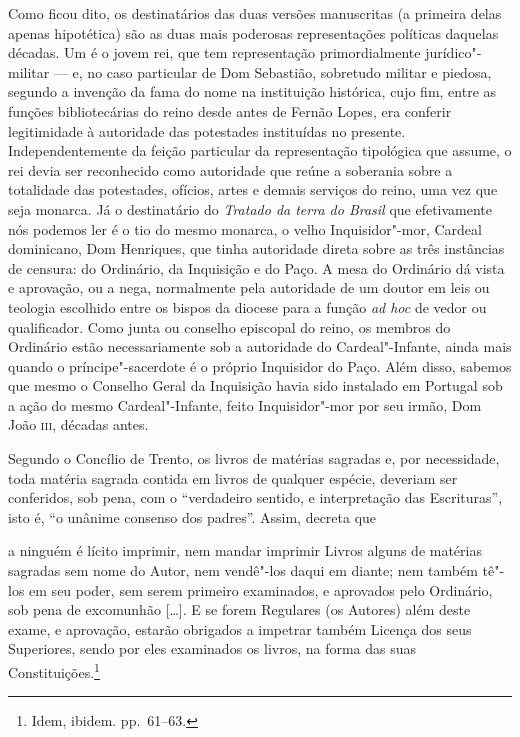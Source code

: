 Como ficou dito, os destinatários das duas versões manuscritas (a
primeira delas apenas hipotética) são as duas mais poderosas
representações políticas daquelas décadas. Um é o jovem rei, que tem
representação primordialmente jurídico"-militar --- e, no caso particular
de Dom Sebastião, sobretudo militar e piedosa, segundo a invenção da
fama do nome na instituição histórica, cujo fim, entre as funções
bibliotecárias do reino desde antes de Fernão Lopes, era conferir
legitimidade à autoridade das potestades instituídas no presente.
Independentemente da feição particular da representação tipológica que
assume, o rei devia ser reconhecido como autoridade que reúne a
soberania sobre a totalidade das potestades, ofícios, artes e demais
serviços do reino, uma vez que seja monarca. Já o destinatário do
\textit{Tratado da terra do Brasil} que efetivamente nós podemos ler é o tio do
mesmo monarca, o velho Inquisidor"-mor, Cardeal dominicano, Dom
Henriques, que tinha autoridade direta sobre as três instâncias de
censura: do Ordinário, da Inquisição e do Paço. A mesa do Ordinário dá
vista e aprovação, ou a nega, normalmente pela autoridade de um doutor
em leis ou teologia escolhido entre os bispos da diocese para a função
\textit{ad hoc} de vedor ou qualificador. Como junta ou conselho episcopal do
reino, os membros do Ordinário estão necessariamente sob a autoridade
do Cardeal"-Infante, ainda mais quando o príncipe"-sacerdote é o próprio
Inquisidor do Paço. Além disso, sabemos que mesmo o Conselho Geral da
Inquisição havia sido instalado em Portugal sob a ação do mesmo
Cardeal"-Infante, feito Inquisidor"-mor por seu irmão, Dom João \textsc{iii},
décadas antes. 

Segundo o Concílio de Trento, os livros de matérias sagradas e, por
necessidade, toda matéria sagrada contida em livros de qualquer
espécie, deveriam ser conferidos, sob pena, com o ``verdadeiro sentido, 
e interpretação das Escrituras'', isto é, ``o unânime consenso
dos padres''. Assim, decreta que 

\begin{hedraquote}
a ninguém é lícito imprimir, nem mandar imprimir Livros alguns de
matérias sagradas sem nome do Autor, nem vendê"-los daqui em diante;
nem também tê"-los em seu poder, sem serem primeiro examinados, e
aprovados pelo Ordinário, sob pena de excomunhão [\ldots{}]. E se forem
Regulares (os Autores) além deste exame, e aprovação, estarão
obrigados a impetrar também Licença dos seus Superiores, sendo por
eles examinados os livros, na forma das suas Constituições.\footnote{ Idem, ibidem. pp.~61--63.}
\end{hedraquote}

